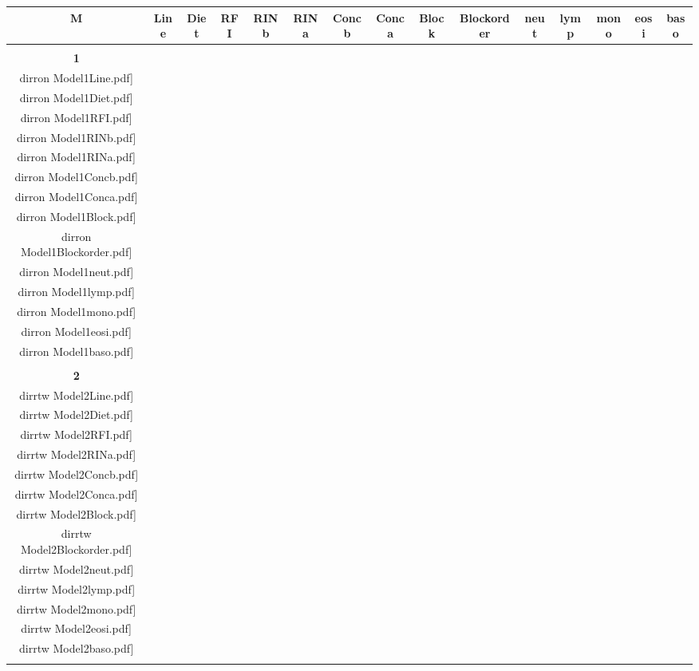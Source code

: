 \documentclass[landscape]{article}
\def \dirron {U:/R/RA/Data/RFI-newdata/resultpairedcbc/pvalue05/Model1.Line.Diet.RFI.Concb.RINb.Conca.RINa.neut.lymp.mono.eosi.baso.Block.Blockorder/}
\def \dirrtw {U:/R/RA/Data/RFI-newdata/resultpairedcbc/pvalue05/Model2.Line.Diet.RFI.Concb.Conca.RINa.neut.lymp.mono.eosi.baso.Block.Blockorder/}
\begin{document}
\begin{table}
\Huge
\centering
\begin{tabular}{ccccccccccccccc}
      {\Huge \textbf{M}} 
      & {\Huge\textbf{ Line}} 
      &{\Huge \textbf{Diet}} 
      & {\Huge \textbf{RFI}}
      &{\Huge\textbf{ RINb}} 
      &{\Huge \textbf{RINa}} 
      &{\Huge \textbf{Concb} } 
      &{\Huge \textbf{Conca} }
      &{\Huge \textbf{Block}} 
      &{\Huge \textbf{Blockorder}}
      &{\Huge \textbf{neut}}
      &{\Huge \textbf{lymp}}
      &{\Huge \textbf{mono}}
      &{\Huge \textbf{eosi}}
      &{\Huge \textbf{baso}}
      \\[3.5pt]
      \hline
      \\[3.5pt]
      {\Huge \textbf{1}} 
      &\texttt{[image: \\dirron Model1Line.pdf]}
      &\texttt{[image: \\dirron Model1Diet.pdf]}
      &\texttt{[image: \\dirron Model1RFI.pdf]}
      &\texttt{[image: \\dirron Model1RINb.pdf]}
      &\texttt{[image: \\dirron Model1RINa.pdf]}
      &\texttt{[image: \\dirron Model1Concb.pdf]}
      &\texttt{[image: \\dirron Model1Conca.pdf]}
      &\texttt{[image: \\dirron Model1Block.pdf]}
      &\texttt{[image: \\dirron Model1Blockorder.pdf]}
      &\texttt{[image: \\dirron Model1neut.pdf]}
      &\texttt{[image: \\dirron Model1lymp.pdf]}
      &\texttt{[image: \\dirron Model1mono.pdf]}
      &\texttt{[image: \\dirron Model1eosi.pdf]}
      &\texttt{[image: \\dirron Model1baso.pdf]}
     \\[3.5pt]
     \hline
     \\[3.5pt]
     {\Huge \textbf{2}} 
      &\texttt{[image: \\dirrtw Model2Line.pdf]}
      &\texttt{[image: \\dirrtw Model2Diet.pdf]}
      &\texttt{[image: \\dirrtw Model2RFI.pdf]}
      &
      &\texttt{[image: \\dirrtw Model2RINa.pdf]}
      &\texttt{[image: \\dirrtw Model2Concb.pdf]}
      &\texttt{[image: \\dirrtw Model2Conca.pdf]}
      &\texttt{[image: \\dirrtw Model2Block.pdf]}
      &\texttt{[image: \\dirrtw Model2Blockorder.pdf]}
      &\texttt{[image: \\dirrtw Model2neut.pdf]}
      &\texttt{[image: \\dirrtw Model2lymp.pdf]}
      &\texttt{[image: \\dirrtw Model2mono.pdf]}
      &\texttt{[image: \\dirrtw Model2eosi.pdf]}
      &\texttt{[image: \\dirrtw Model2baso.pdf]}
     \\[3.5pt]
     \hline
     \\[3.5pt]

\end{tabular}
\end{table}
\end{document}
